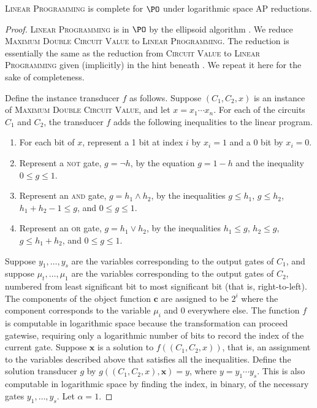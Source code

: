 \begin{theorem}\label{thm:lpinpo}
  \textsc{Linear Programming} is complete for $\PO$ under logarithmic space AP reductions.
\end{theorem}
\begin{proof}
  \textsc{Linear Programming} is in $\PO$ by the ellipsoid algorithm \cite{khachian79}.
  We reduce \textsc{Maximum Double Circuit Value} to \textsc{Linear Programming}.
  The reduction is essentially the same as the reduction from \textsc{Circuit Value} to \textsc{Linear Programming} given (implicitly) in the hint beneath \cite[Problem~A.4.1]{ghr95}.
  We repeat it here for the sake of completeness.

  Define the instance transducer $f$ as follows.
  Suppose $(C_1, C_2, x)$ is an instance of \textsc{Maximum Double Circuit Value}, and let $x = x_1 \dotsb x_n$.
  For each of the circuits $C_1$ and $C_2$, the transducer $f$ adds the following inequalities to the linear program.
  \begin{enumerate}
  \item For each bit of $x$, represent a 1 bit at index $i$ by $x_i = 1$ and a 0 bit by $x_i = 0$.
  \item Represent a \textsc{not} gate, $g = \lnot h$, by the equation $g = 1 - h$ and the inequality $0 \leq g \leq 1$.
  \item Represent an \textsc{and} gate, $g = h_1 \land h_2$, by the inequalities $g \leq h_1$, $g \leq h_2$, $h_1 + h_2 - 1 \leq g$, and $0 \leq g \leq 1$.
  \item Represent an \textsc{or} gate, $g = h_1 \lor h_2$, by the inequalities $h_1 \leq g$, $h_2 \leq g$, $g \leq h_1 + h_2$, and $0 \leq g \leq 1$.
  \end{enumerate}
  Suppose $y_1, \dotsc, y_s$ are the variables corresponding to the output gates of $C_1$, and suppose $\mu_t, \dotsc, \mu_1$ are the variables corresponding to the output gates of $C_2$, numbered from least significant bit to most significant bit (that is, right-to-left).
  The components of the object function $\mathbf{c}$ are assigned to be $2^i$ where the component corresponds to the variable $\mu_i$ and 0 everywhere else.
  The function $f$ is computable in logarithmic space because the transformation can proceed gatewise, requiring only a logarithmic number of bits to record the index of the current gate.
  Suppose $\mathbf{x}$ is a solution to $f((C_1, C_2, x))$, that is, an assignment to the variables described above that satisfies all the inequalities.
  Define the solution transducer $g$ by $g((C_1, C_2, x), \mathbf{x}) = y$, where $y = y_1 \dotsb y_s$.
  This is also computable in logarithmic space by finding the index, in binary, of the necessary gates $y_1, \dotsc, y_s$.
  Let $\alpha = 1$.


\end{proof}
